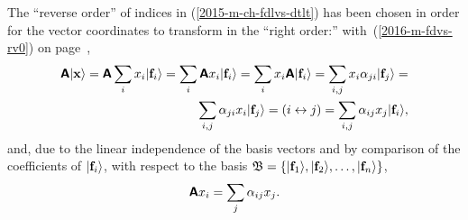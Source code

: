 The ``reverse order'' of indices in (\ref{2015-m-ch-fdlvs-dtlt}) has been chosen
in order for the vector coordinates to transform in the ``right order:''
with~(\ref{2016-m-fdvs-rv0}) on page~\pageref{2016-m-fdvs-rv0},
\begin{equation}
\begin{split}
\textsf{\textbf{A}}\vert  {\bf x} \rangle =
\textsf{\textbf{A}} \sum_i x_i \vert  {\bf f}_i \rangle =
\sum_i \textsf{\textbf{A}} x_i \vert  {\bf f}_i \rangle =
\sum_i x_i \textsf{\textbf{A}} \vert  {\bf f}_i \rangle =
\sum_{i,j} x_i \alpha_{ji} \vert  {\bf f}_j \rangle =  \\
\sum_{i,j} \alpha_{ji}  x_i \vert  {\bf f}_j \rangle =
(i\leftrightarrow j) =
\sum_{i,j} \alpha_{ij}  x_j \vert  {\bf f}_i \rangle ,
\end{split}
\label{2016-m-ch-fdlvs-dtltk}
\end{equation}
and, due to the linear independence of the basis vectors and by comparison of the coefficients of $\vert  {\bf f}_i \rangle$,
with respect to  the basis
${\frak B}=\{\vert {\bf f}_1 \rangle ,\vert {\bf f}_2 \rangle,\ldots ,\vert {\bf f}_n \rangle\}$,
\begin{equation}
\textsf{\textbf{A}} x_i = \sum_{j} \alpha_{ij}  x_j  .
\label{2016-m-ch-fdlvs-dtltk1}
\end{equation}


